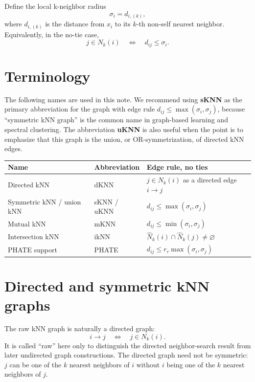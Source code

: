 \documentclass[11pt]{article}
\begin{document}
Define the local k-neighbor radius
\[
  \sigma_i=d_{i,(k)},
\]
where \(d_{i,(k)}\) is the distance from \(x_i\) to its \(k\)-th non-self nearest neighbor.
Equivalently, in the no-tie case,
\[
  j\in N_k(i)
  \quad\Longleftrightarrow\quad
  d_{ij}\le \sigma_i.
\]

\section{Terminology}

The following names are used in this note.  We recommend using \textbf{sKNN} as the primary
abbreviation for the graph with edge rule \(d_{ij}\le \max(\sigma_i,\sigma_j)\), because
``symmetric kNN graph'' is the common name in graph-based learning and spectral clustering.
The abbreviation \textbf{uKNN} is also useful when the point is to emphasize that this graph
is the union, or OR-symmetrization, of directed kNN edges.

\begin{center}
\begin{tabular}{lll}
\toprule
Name & Abbreviation & Edge rule, no ties \\
\midrule
Directed kNN & dKNN & \(j\in N_k(i)\) as a directed edge \(i\to j\) \\
Symmetric kNN / union kNN & sKNN / uKNN & \(d_{ij}\le \max(\sigma_i,\sigma_j)\) \\
Mutual kNN & mKNN & \(d_{ij}\le \min(\sigma_i,\sigma_j)\) \\
Intersection kNN & ikNN & \(\widehat{N}_k(i)\cap\widehat{N}_k(j)\ne\varnothing\) \\
PHATE support & PHATE & \(d_{ij}\le r_\tau\max(\sigma_i,\sigma_j)\) \\
\bottomrule
\end{tabular}
\end{center}

\section{Directed and symmetric kNN graphs}

The raw kNN graph is naturally a directed graph:
\[
  i\to j
  \quad\Longleftrightarrow\quad
  j\in N_k(i).
\]
It is called ``raw'' here only to distinguish the directed neighbor-search result from later
undirected graph constructions.  The directed graph need not be symmetric: \(j\) can be one
of the \(k\) nearest neighbors of \(i\) without \(i\) being one of the \(k\) nearest neighbors
of \(j\).
\end{document}
